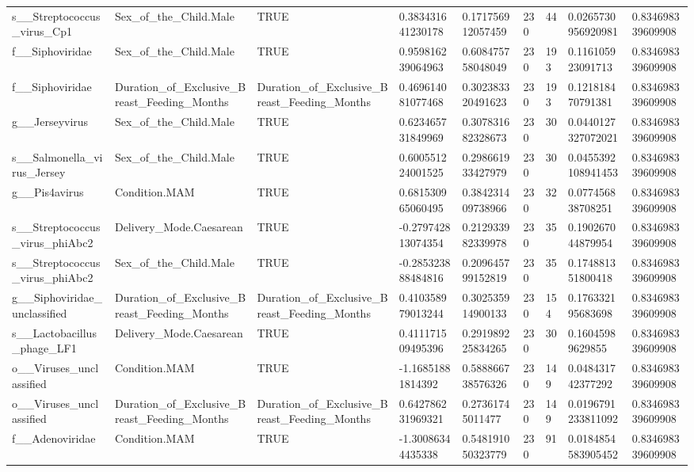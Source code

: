 \begin{longtable}{lllllllll}
s\_\_Streptococcus\_virus\_Cp1 & Sex\_of\_the\_Child.Male & TRUE & 0.383431641230178 & 0.171756912057459 & 230 & 44 & 0.0265730956920981 & 0.834698339609908 \\
f\_\_Siphoviridae & Sex\_of\_the\_Child.Male & TRUE & 0.959816239064963 & 0.608475758048049 & 230 & 193 & 0.116105923091713 & 0.834698339609908 \\
f\_\_Siphoviridae & Duration\_of\_Exclusive\_Breast\_Feeding\_Months & Duration\_of\_Exclusive\_Breast\_Feeding\_Months & 0.469614081077468 & 0.302383320491623 & 230 & 193 & 0.121818470791381 & 0.834698339609908 \\
g\_\_Jerseyvirus & Sex\_of\_the\_Child.Male & TRUE & 0.623465731849969 & 0.307831682328673 & 230 & 30 & 0.0440127327072021 & 0.834698339609908 \\
s\_\_Salmonella\_virus\_Jersey & Sex\_of\_the\_Child.Male & TRUE & 0.600551224001525 & 0.298661933427979 & 230 & 30 & 0.0455392108941453 & 0.834698339609908 \\
g\_\_Pis4avirus & Condition.MAM & TRUE & 0.681530965060495 & 0.384231409738966 & 230 & 32 & 0.077456838708251 & 0.834698339609908 \\
s\_\_Streptococcus\_virus\_phiAbc2 & Delivery\_Mode.Caesarean & TRUE & -0.279742813074354 & 0.212933982339978 & 230 & 35 & 0.190267044879954 & 0.834698339609908 \\
s\_\_Streptococcus\_virus\_phiAbc2 & Sex\_of\_the\_Child.Male & TRUE & -0.285323888484816 & 0.209645799152819 & 230 & 35 & 0.174881351800418 & 0.834698339609908 \\
g\_\_Siphoviridae\_unclassified & Duration\_of\_Exclusive\_Breast\_Feeding\_Months & Duration\_of\_Exclusive\_Breast\_Feeding\_Months & 0.410358979013244 & 0.302535914900133 & 230 & 154 & 0.176332195683698 & 0.834698339609908 \\
s\_\_Lactobacillus\_phage\_LF1 & Delivery\_Mode.Caesarean & TRUE & 0.411171509495396 & 0.291989225834265 & 230 & 30 & 0.16045989629855 & 0.834698339609908 \\
o\_\_Viruses\_unclassified & Condition.MAM & TRUE & -1.16851881814392 & 0.588866738576326 & 230 & 149 & 0.048431742377292 & 0.834698339609908 \\
o\_\_Viruses\_unclassified & Duration\_of\_Exclusive\_Breast\_Feeding\_Months & Duration\_of\_Exclusive\_Breast\_Feeding\_Months & 0.642786231969321 & 0.27361745011477 & 230 & 149 & 0.0196791233811092 & 0.834698339609908 \\
f\_\_Adenoviridae & Condition.MAM & TRUE & -1.30086344435338 & 0.548191050323779 & 230 & 91 & 0.0184854583905452 & 0.834698339609908 \\

\end{longtable}
